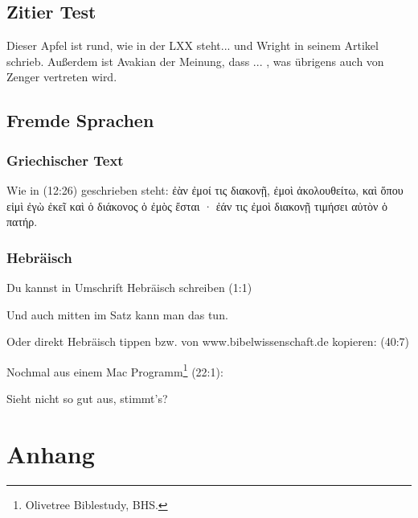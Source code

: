 \documentclass[12pt,oneside,a4paper]{scrreprt}
\begin{document}
\section{Zitier Test}
\glqq Dieser Apfel ist rund\grqq, wie in der LXX steht\autocite[Vgl. Gen 1,1 in ][]{LXX}... und Wright in seinem Artikel schrieb. \autocite{Wright:2015tp}
Außerdem ist Avakian der Meinung, dass ... \autocite{Avakian:2012tz}, was übrigens auch von Zenger vertreten wird. \autocite[Vgl.][45]{ZengerPs}

\section{Fremde Sprachen}
\subsection{Griechischer Text}
Wie in (12:26) geschrieben steht: ἐὰν ἐμοί τις διακονῇ, ἐμοὶ ἀκολουθείτω, καὶ ὅπου εἰμὶ ἐγὼ ἐκεῖ καὶ ὁ διάκονος ὁ ἐμὸς ἔσται · ἐάν τις ἐμοὶ διακονῇ τιμήσει αὐτὸν ὁ πατήρ.\autocite{NA:28}
\subsection{Hebräisch}
Du kannst in Umschrift Hebräisch schreiben
(1:1) 

Und auch mitten im Satz  kann man das tun.

Oder direkt Hebräisch tippen bzw. von www.bibelwissenschaft.de kopieren:
(40:7)

Nochmal aus einem Mac Programm\footnote{Olivetree Biblestudy, BHS.} (22:1):

 
Sieht nicht so gut aus, stimmt's?
 
\chapter{Anhang}
\end{document}
